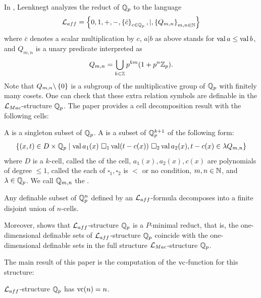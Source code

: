 In \cite{reduct}, Leenknegt analyzes the reduct of $\mathbb{Q}_p$ to the language
\begin{align*}
  \mathcal L_{aff}  = \left\{0, 1, +, -, \left\{\bar c\right\}_{c \in \mathbb{Q}_p}, |, \left\{Q_{m,n}\right\}_{m,n\in \mathbb{N}}\right\}
\end{align*}
where $\bar c$ denotes a scalar multiplication by $c$,
$a | b$ as above stands for $\operatorname{val} a \leq \operatorname{val} b$,
and $Q_{m,n}$ is a unary predicate interpreted as
\begin{align*}
  Q_{m,n} = \bigcup_{k \in \mathbb{Z}} p^{km} (1 + p^n\mathbb{Z}_p).
\end{align*}
Note that $Q_{m,n} \backslash \left\{0\right\}$ is a subgroup of the multiplicative group of $\mathbb{Q}_p$ with finitely many cosets.
One can check that these extra relation symbols are definable in the $\mathcal L_{Mac}$-structure $\mathbb{Q}_p$.
The paper \cite{reduct} provides a cell decomposition result with the following cells:

\begin{Definition} \label{cell}
  A  is a singleton subset of $\mathbb{Q}_p$.
  A  is a subset of $\mathbb{Q}_p^{k+1}$ of the following form:
  \begin{align*}
    \left\{(x, t) \in D \times \mathbb{Q}_p \mid \operatorname{val} a_1(x) \ \square_1 \operatorname{val} (t - c(x)) \ \square_2 \operatorname{val} a_2(x), t - c(x) \in \lambda Q_{m,n} \right\}
  \end{align*}
  where $D$ is a $k$-cell, called the  of the cell,
  $a_1(x), a_2(x), c(x)$ are polynomials of degree $\leq 1$, called the 
  each of $\square_1, \square_2$ is $<$ or no condition,
  $m,n \in \mathbb{N}$,
  and
  $\lambda  \in\mathbb{Q}_p$.
  We call $\mathbb{Q}_{m,n}$ the .
\end{Definition}

\begin{Theorem}[Leenknegt '12] 
  Any definable subset of $\mathbb{Q}_p^n$ defined by an $\mathcal L_{aff}$-formula decomposes into a finite disjoint union of $n$-cells.
\end{Theorem}  

Moreover, \cite{reduct} shows that $\mathcal L_{aff}$-structure $\mathbb{Q}_p$ is a $P$-minimal reduct,
that is, the one-dimensional definable sets of $\mathcal L_{aff}$-structure $\mathbb{Q}_p$
coincide with the one-dimensional definable sets in the full structure $\mathcal L_{Mac}$-structure $\mathbb{Q}_p$.

The main result of this paper is the computation of the $\operatorname{vc}$-function for this structure:
\begin{Theorem} \label{main_theorem}
  $\mathcal L_{aff}$-structure $\mathbb{Q}_p$ has $\operatorname{vc}(n) = n$.
\end{Theorem}

